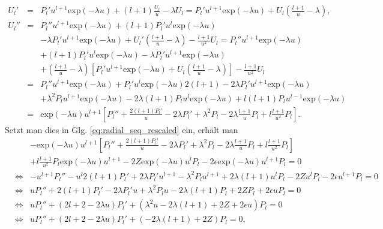 \documentclass{book}
\renewcommand{\exp}{\text{exp}}
\begin{document}
\begin{eqnarray}
U_l' & = & P_l'u^{l + 1}\exp\left(-\lambda u\right) + \left(l + 1\right)\frac{U_l}{u} - \lambda U_l = P_l'u^{l + 1}\exp\left(-\lambda u\right) + U_l\left(\frac{l + 1}{u} - \lambda\right),\\
U_l'' & = & P_l''u^{l + 1}\exp\left(-\lambda u\right) + \left(l + 1\right)P_l'u^l\exp\left(-\lambda u\right)\nonumber\\
&&- \lambda P_l'u^{l + 1}\exp\left(-\lambda u\right) + U_l'\left(\frac{l + 1}{u} - \lambda\right) - \frac{l + 1}{u^2}U_l = P_l''u^{l + 1}\exp\left(-\lambda u\right)\nonumber\\
&&+ \left(l + 1\right)P_l'u^l\exp\left(-\lambda u\right) - \lambda P_l'u^{l + 1}\exp\left(-\lambda u\right)\nonumber\\
&&+ \left(\frac{l + 1}{u} - \lambda\right)\left[P_l'u^{l + 1}\exp\left(-\lambda u\right) + U_l\left(\frac{l + 1}{u} - \lambda\right)\right] - \frac{l + 1}{u^2}U_l\nonumber\\
& = & P_l''u^{l + 1}\exp\left(-\lambda u\right) + P_l'u^l\exp\left(-\lambda u\right)2\left(l + 1\right) - 2\lambda P_l'u^{l + 1}\exp\left(-\lambda u\right)\nonumber\\
&&+ \lambda^2P_lu^{l + 1}\exp\left(-\lambda u\right) - 2\lambda\left(l + 1\right)P_lu^l\exp\left(-\lambda u\right) + l\left(l + 1\right)P_lu^{l - 1}\exp\left(-\lambda u\right)\nonumber\\
& = & \exp\left(-\lambda u\right)u^{l + 1}\left[P_l'' + \frac{2\left(l + 1\right)P_l'}{u} - 2\lambda P_l' + \lambda^2P_l - 2\lambda\frac{l + 1}{u}P_l + l\frac{l + 1}{u^2}P_l\right].
\end{eqnarray}
%
Setzt man dies in Glg. \eqref{eq:radial_seq_rescaled} ein, erhält man
%
\begin{eqnarray}
&&- \exp\left(-\lambda u\right)u^{l + 1}\left[P_l'' + \frac{2\left(l + 1\right)P_l'}{u} - 2\lambda P_l' + \lambda^2P_l - 2\lambda\frac{l + 1}{u}P_l + l\frac{l + 1}{u^2}P_l\right]\nonumber\\
&&+ l\frac{l + 1}{u^2}P_l\exp\left(-\lambda u\right)u^{l + 1} - 2Z\exp\left(-\lambda
u\right)u^lP_l - 2\epsilon\exp\left(-\lambda u\right)u^{l + 1}P_l = 0\nonumber\\
&\Leftrightarrow& -u^{l + 1}P_l'' - u^l2\left(l + 1\right)P_l' + 2\lambda P_l'u^{l + 1} - \lambda^2P_lu^{l + 1} + 2\lambda\left(l + 1\right)u^lP_l - 2Zu^lP_l - 2\epsilon u^{l + 1}P_l = 0\nonumber\\
&\Leftrightarrow&uP_l'' + 2\left(l + 1\right)P_l' - 2\lambda P_l'u + \lambda^2P_lu - 2\lambda\left(l + 1\right)P_l + 2ZP_l + 2\epsilon uP_l = 0\nonumber\\
&\Leftrightarrow&uP_l'' + \left(2l + 2 - 2\lambda u\right)P_l' + \left(\lambda^2u - 2\lambda\left(l + 1\right) + 2Z + 2\epsilon u\right)P_l = 0\nonumber\\
&\Leftrightarrow&uP_l'' + \left(2l + 2 - 2\lambda u\right)P_l' + \left(-2\lambda\left(l + 1\right) + 2Z\right)P_l = 0, 
\end{eqnarray}
\end{document}
